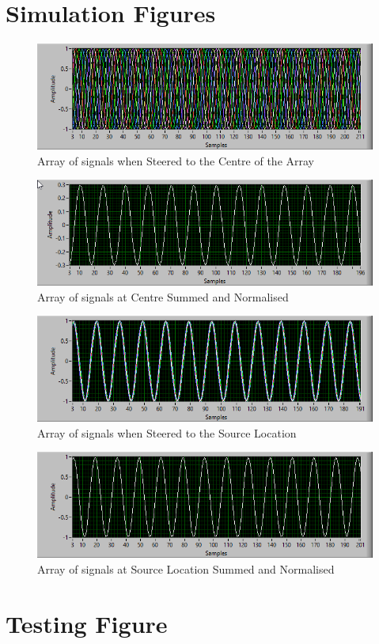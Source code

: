 \documentclass{UoNMCHA}
\numberwithin{equation}{section}
\begin{document}
\section{Simulation Figures} \label{app:Sim}
    \begin{figure}[H]
        \centering
        \includegraphics[keepaspectratio, width = \textwidth]{Figures/SimSignalCentre.png}
        \caption{Array of signals when Steered to the Centre of the Array}
    \end{figure}
    \begin{figure}[H]
        \centering
        \includegraphics[keepaspectratio, width = \textwidth]{Figures/SimSignalCentreSum.png}
        \caption{Array of signals at Centre Summed and Normalised}
    \end{figure}
    \begin{figure}[H]
        \centering
        \includegraphics[keepaspectratio, width = \textwidth]{Figures/SimSignalLocation.png}
        \caption{Array of signals when Steered to the Source Location}
    \end{figure}
    \begin{figure}[H]
        \centering
        \includegraphics[keepaspectratio, width = \textwidth]{Figures/SimSignalLocationSum.png}
        \caption{Array of signals at Source Location Summed and Normalised}
    \end{figure}

\newpage
\section{Testing Figure} \label{app: Testing Figures}
\end{document}
